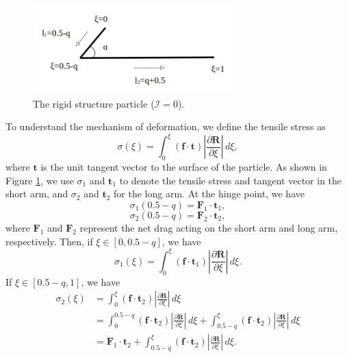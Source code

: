 \documentclass[12pt,MSc,twoside]{muthesis_2020}
\begin{document}
\begin{figure}[!h]
	\begin{center}
		\includegraphics[width=0.7\textwidth]{plot/tensile_boomerang.png}
		\caption{The rigid structure particle ($\mathcal{I}=0$).}
    \label{fig:15}
	\end{center}
\end{figure}
To understand the mechanism of deformation, we define the tensile stress as 
	\begin{equation}
 \label{eqn:91}
		\sigma(\xi)=\int_0^\xi (\mathbf{f}\cdot\mathbf{t}) \left |\frac{\partial \mathbf{R}}{\partial \xi}\right|\,d\xi,
	\end{equation}
where $\mathbf{t}$ is the unit tangent vector to the surface of the particle. As shown in Figure \ref{fig:15}, we use $\sigma_1$ and $\mathbf{t}_1$ to denote the tensile stress and tangent vector in the short arm, and $\sigma_2$ and $\mathbf{t}_2$ for the long arm. At the hinge point, we have 
	\begin{equation}
 \label{eqn:92}
	\sigma_1(0.5-q)=\mathbf{F}_1\cdot\mathbf{t}_1, 
\end{equation}
	\begin{equation}
 \label{eqn:93}
	\sigma_2(0.5-q)=\mathbf{F}_2\cdot\mathbf{t}_2, 
\end{equation}
where $\mathbf{F}_1$ and $\mathbf{F}_2$ represent the net drag acting on the short arm and long arm, respectively. Then, if $\xi \in [0,0.5-q]$, we have 
	\begin{equation}
 \label{eqn:94}
	\sigma_1(\xi)= \int_0^\xi (\mathbf{f}\cdot\mathbf{t}_1) \left |\frac{\partial \mathbf{R}}{\partial \xi}\right|\,d\xi.
\end{equation}
If $\xi \in [0.5-q,1]$, we have
	\begin{equation}
		\label{eqn:95}
	\begin{aligned}
	\sigma_2(\xi)&= \int_0^\xi (\mathbf{f}\cdot\mathbf{t}_2) \left |\frac{\partial \mathbf{R}}{\partial \xi}\right|\,d\xi\\
	&=\int_0^{0.5-q} (\mathbf{f}\cdot\mathbf{t}_2) \left |\frac{\partial \mathbf{R}}{\partial \xi}\right|\,d\xi+\int_{0.5-q}^\xi (\mathbf{f}\cdot\mathbf{t}_2) \left |\frac{\partial \mathbf{R}}{\partial \xi}\right|\,d\xi\\
	&=\mathbf{F}_1\cdot\mathbf{t}_2+\int_{0.5-q}^\xi (\mathbf{f}\cdot\mathbf{t}_2) \left |\frac{\partial \mathbf{R}}{\partial \xi}\right|\,d\xi.
\end{aligned}
\end{equation}
\end{document}
